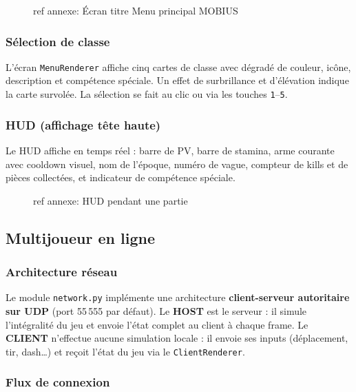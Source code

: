 \documentclass[12pt,a4paper]{article}
\begin{document}
\begin{figure}[H]
  \centering
  \caption{ref annexe: Écran titre \textemdash{} Menu principal MOBIUS}
\end{figure}

\subsubsection*{Sélection de classe}

L'écran \texttt{MenuRenderer} affiche cinq cartes de classe avec dégradé de couleur, icône, description et compétence spéciale. Un effet de surbrillance et d'élévation indique la carte survolée. La sélection se fait au clic ou via les touches \texttt{1}--\texttt{5}.

\subsubsection*{HUD (affichage tête haute)}

Le HUD affiche en temps réel : barre de PV, barre de stamina, arme courante avec cooldown visuel, nom de l'époque, numéro de vague, compteur de kills et de pièces collectées, et indicateur de compétence spéciale.

\begin{figure}[H]
  \centering
  \caption{ref annexe: HUD pendant une partie}
\end{figure}

\subsection{Multijoueur en ligne}
\label{sec:multi}

\subsubsection*{Architecture réseau}

Le module \texttt{network.py} implémente une architecture \textbf{client-serveur autoritaire sur UDP} (port 55\,555 par défaut). Le \textbf{HOST} est le serveur : il simule l'intégralité du jeu et envoie l'état complet au client à chaque frame. Le \textbf{CLIENT} n'effectue aucune simulation locale : il envoie ses inputs (déplacement, tir, dash\ldots) et reçoit l'état du jeu via le \texttt{ClientRenderer}.

\subsubsection*{Flux de connexion}
\end{document}
